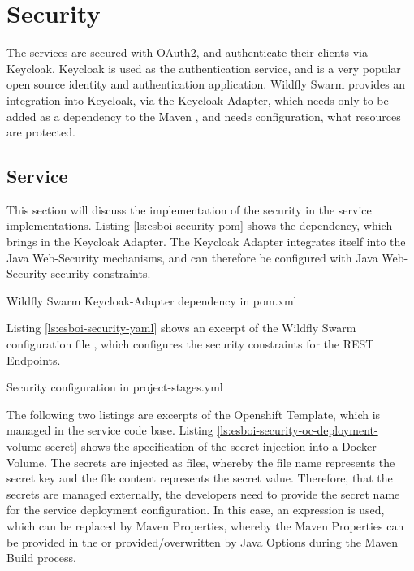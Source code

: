 \section{Security}
\label{sec:esbi-security}
The services are secured with OAuth2, and authenticate their clients via Keycloak. Keycloak is used as the authentication service, and is a very popular open source identity and authentication application. Wildfly Swarm provides an integration into Keycloak, via the Keycloak Adapter, which needs only to be added as a dependency to the Maven , and needs configuration, what resources are protected.

\subsection{Service}
\label{sec:esbi-security-service}
This section will discuss the implementation of the security in the service implementations. Listing \vref{ls:esboi-security-pom} shows the dependency, which brings in the Keycloak Adapter. The Keycloak Adapter integrates itself into the Java Web-Security mechanisms, and can therefore be configured with Java Web-Security security constraints.

\begin{listing}[h]
	\caption{Wildfly Swarm Keycloak-Adapter dependency in pom.xml}
	\label{ls:esboi-security-pom}
\end{listing}

Listing \vref{ls:esboi-security-yaml} shows an excerpt of the Wildfly Swarm configuration file , which configures the security constraints for the REST Endpoints.

\begin{listing}[h]
	\caption{Security configuration in project-stages.yml}
	\label{ls:esboi-security-yaml}
\end{listing}

The following two listings are excerpts of the  Openshift Template, which is managed in the service code base. Listing \vref{ls:esboi-security-oc-deployment-volume-secret} shows the specification of the secret injection into a Docker Volume. The secrets are injected as files, whereby the file name represents the secret key and the file content represents the secret value. Therefore, that the secrets are managed externally, the developers need to provide the secret name for the service deployment configuration. In this case, an expression is used, which can be replaced by Maven Properties, whereby the Maven Properties can be provided in the  or provided/overwritten by Java Options during the Maven Build process.

